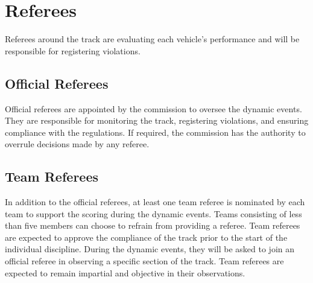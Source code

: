 \section{Referees}

Referees around the track are evaluating each vehicle’s performance and will be responsible for registering violations.

\subsection{Official Referees}

Official referees are appointed by the commission to oversee the dynamic events.
They are responsible for monitoring the track, registering violations, and ensuring compliance with the regulations.
If required, the commission has the authority to overrule decisions made by any referee.

\subsection{Team Referees}

In addition to the official referees, at least one team referee is nominated by each team to support the scoring during the dynamic events.
Teams consisting of less than five members can choose to refrain from providing a referee.
Team referees are expected to approve the compliance of the track prior to the start of the individual discipline.
During the dynamic events, they will be asked to join an official referee in observing a specific section of the track.
Team referees are expected to remain impartial and objective in their observations.



